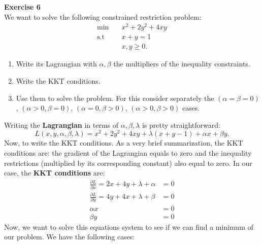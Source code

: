 \documentclass[11pt,table]{article}
\newenvironment{problem}[2][Exercise]
    { \begin{mdframed}[backgroundcolor=gray!20] \textbf{#1 #2} \\}
    {  \end{mdframed}}
\begin{document}
\begin{problem}{6}
We want to solve the following constrained restriction problem:
\begin{align*}
  \min \quad       & x^{2} + 2y^{2} + 4xy \\
  \text{s.t} \quad & x + y = 1            \\
                   & x,y \geq 0.
\end{align*}
\begin{enumerate}
  \item Write its Lagrangian with \(\alpha,\beta\) the multipliers of the inequality constraints.
  \item Write the KKT conditions.
  \item Use them to solve the problem. For this consider separately the \((\alpha = \beta = 0)\), \((\alpha > 0, \beta = 0)\), \((\alpha = 0, \beta > 0)\), \((\alpha > 0, \beta > 0)\) cases.
\end{enumerate}
\end{problem}

Writing the \textbf{Lagrangian} in terms of \(\alpha,\beta,\lambda\) is pretty straightforward:
\[
  L(x,y,\alpha,\beta,\lambda) = x^{2} + 2y^{2} + 4xy + \lambda(x+y - 1) + \alpha x + \beta y .
\]
Now, to write the KKT conditions. As a very brief summarization, the KKT conditions are: the gradient of the Lagrangian equals to zero and the inequality restrictions (multiplied by its corresponding constant) also equal to zero. In our case, the \textbf{KKT conditions} are:
\begin{align*}
  \frac{\partial L}{\partial x}  = 2x + 4y + \lambda + \alpha & = 0 \\
  \frac{\partial L}{\partial y}  = 4y + 4x + \lambda + \beta  & = 0 \\
  \alpha x                                                    & = 0 \\
  \beta y                                                     & = 0
\end{align*}
Now, we want to solve this equations system to see if we can find a minimum of our problem. We have the following cases:
\end{document}
